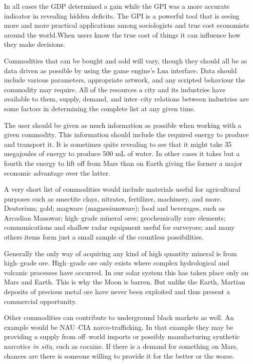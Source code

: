 In all cases the GDP determined a gain while the GPI was a more accurate indicator in revealing hidden deficits. The GPI is a powerful tool that is seeing more and more practical applications among sociologists and true cost economists around the world.\footnotecite[costanzaa2004] When users know the true cost of things it can influence how they make decisions.

Commodities that can be bought and sold will vary, though they should all be as data driven as possible by using the game engine's Lua interface. Data should include various parameters, appropriate artwork, and any scripted behaviour the commodity may require. All of the resources a city and its industries have available to them, supply, demand, and inter--city relations between industries are some factors in determining the complete list at any given time.

The user should be given as much information as possible when working with a given commodity. This information should include the required energy to produce and transport it. It is sometimes quite revealing to see that it might take 35 megajoules of energy to produce 500 mL of water. In other cases it takes but a fourth the energy to lift off from Mars than on Earth giving the former a major economic advantage over the latter.

A very short list of commodities would include materials useful for agricultural purposes such as smectite clays, nitrates, fertilizer, machinery, and more. Deuterium; gold; magware (magnesiumware); food and beverages, such as Arcadian Manowar; high--grade mineral ores; geochemically rare elements; communications and shallow radar equipment useful for surveyors; and many others items form just a small sample of the countless possibilities.

Generally the only way of acquiring any kind of high quantity mineral is from high--grade ore. High--grade ore only exists where complex hydrological and volcanic processes have occurred. In our solar system this has taken place only on Mars and Earth. This is why the Moon is barren. But unlike the Earth, Martian deposits of precious metal ore have never been exploited and thus present a commercial opportunity.

Other commodities can contribute to underground black markets as well. An example would be NAU--CIA narco-trafficking. In that example they may be providing a supply from off--world imports or possibly manufacturing synthetic narcotics {\it in situ}, such as cocaine. If there is a demand for something on Mars, chances are there is someone willing to provide it for the better or the worse.

